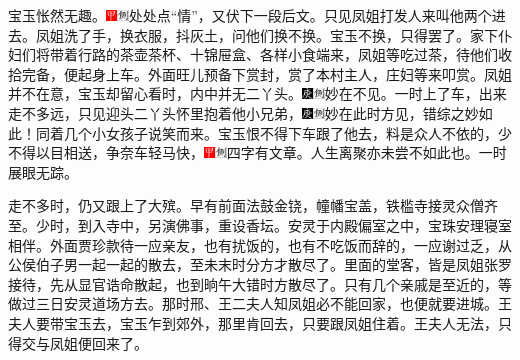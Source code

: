 宝玉怅然无趣。{\includegraphics[width=3mm]{../Images/00002}\includegraphics[width=3mm]{../Images/00011}\footnotesize \kaishu 处处点``情''，又伏下一段后文。}只见凤姐打发人来叫他两个进去。凤姐洗了手，换衣服，抖灰土，问他们换不换。宝玉不换，只得罢了。家下仆妇们将带着行路的茶壶茶杯、十锦屉盒、各样小食端来，凤姐等吃过茶，待他们收拾完备，便起身上车。外面旺儿预备下赏封，赏了本村主人，庄妇等来叩赏。凤姐并不在意，宝玉却留心看时，内中并无二丫头。{\includegraphics[width=3mm]{../Images/00004}\includegraphics[width=3mm]{../Images/00011}\footnotesize \kaishu 妙在不见。}一时上了车，出来走不多远，只见迎头二丫头怀里抱着他小兄弟，{\includegraphics[width=3mm]{../Images/00004}\includegraphics[width=3mm]{../Images/00011}\footnotesize \kaishu 妙在此时方见，错综之妙如此！}同着几个小女孩子说笑而来。宝玉恨不得下车跟了他去，料是众人不依的，少不得以目相送，争奈车轻马快，{\includegraphics[width=3mm]{../Images/00002}\includegraphics[width=3mm]{../Images/00011}\footnotesize \kaishu 四字有文章。人生离聚亦未尝不如此也。}一时展眼无踪。

走不多时，仍又跟上了大殡。早有前面法鼓金铙，幢幡宝盖，铁槛寺接灵众僧齐至。少时，到入寺中，另演佛事，重设香坛。安灵于内殿偏室之中，宝珠安理寝室相伴。外面贾珍款待一应亲友，也有扰饭的，也有不吃饭而辞的，一应谢过乏，从公侯伯子男一起一起的散去，至未末时分方才散尽了。里面的堂客，皆是凤姐张罗接待，先从显官诰命散起，也到晌午大错时方散尽了。只有几个亲戚是至近的，等做过三日安灵道场方去。那时邢、王二夫人知凤姐必不能回家，也便就要进城。王夫人要带宝玉去，宝玉乍到郊外，那里肯回去，只要跟凤姐住着。王夫人无法，只得交与凤姐便回来了。

